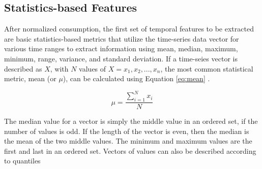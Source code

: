 \subsection{Statistics-based Features}
\label{sec:statisticsfeatures}

After normalized consumption, the first set of temporal features to be extracted are basic statistics-based metrics that utilize the time-series data vector for various time ranges to extract information using mean, median, maximum, minimum, range, variance, and standard deviation. If a time-seies vector is described as $X$, with $N$ values of $X = {x_1, x_2,...,x_n}$, the most common statistical metric, mean (or $\mu$), can be calculated using Equation \ref{eq:mean} \cite{Mitsa_2010}.

\begin{equation}
\mu = \frac{\sum\limits_{i=1}^N x_i}{N}
\label{eq:mean}
\end{equation}

The median value for a vector is simply the middle value in an ordered set, if the number of values is odd. If the length of the vector is even, then the median is the mean of the two middle values. The minimum and maximum values are the first and last in an ordered set. Vectors of values can also be described according to quantiles